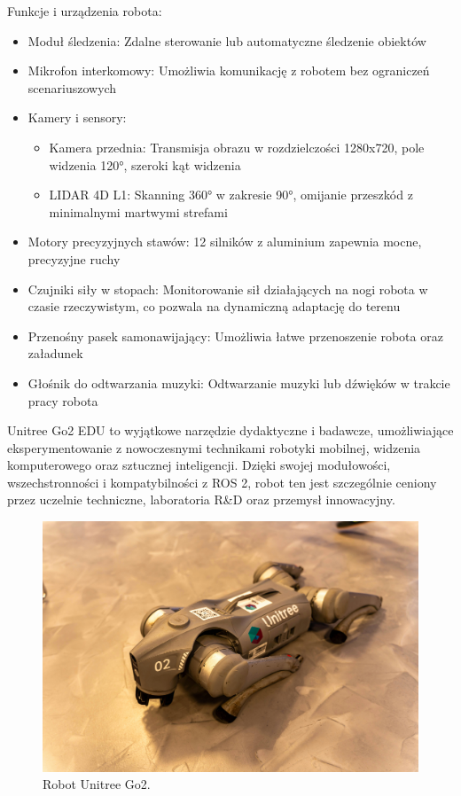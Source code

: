 \documentclass[12pt]{article}
\begin{document}
Funkcje i urządzenia robota:
\begin{itemize}
    \item Moduł śledzenia: Zdalne sterowanie lub automatyczne śledzenie obiektów
    \item Mikrofon interkomowy: Umożliwia komunikację z robotem bez ograniczeń scenariuszowych
    \item Kamery i sensory:
    \begin{itemize}
        \item Kamera przednia: Transmisja obrazu w rozdzielczości 1280x720, pole widzenia 120°, szeroki kąt widzenia
        \item LIDAR 4D L1: Skanning 360° w zakresie 90°, omijanie przeszkód z minimalnymi martwymi strefami
    \end{itemize}
    \item Motory precyzyjnych stawów: 12 silników z aluminium zapewnia mocne, precyzyjne ruchy
    \item Czujniki siły w stopach: Monitorowanie sił działających na nogi robota w czasie rzeczywistym, co pozwala na dynamiczną adaptację do terenu
    \item Przenośny pasek samonawijający: Umożliwia łatwe przenoszenie robota oraz załadunek
    \item Głośnik do odtwarzania muzyki: Odtwarzanie muzyki lub dźwięków w trakcie pracy robota
\end{itemize}


\noindent Unitree Go2 EDU to wyjątkowe narzędzie dydaktyczne i badawcze, umożliwiające eksperymentowanie z nowoczesnymi technikami robotyki mobilnej, widzenia komputerowego oraz sztucznej inteligencji. Dzięki swojej modułowości, wszechstronności i kompatybilności z ROS 2, robot ten jest szczególnie ceniony przez uczelnie techniczne, laboratoria R\&D oraz przemysł innowacyjny.


\begin{figure}[h]
    \centering
    \includegraphics[width=0.75\linewidth]{Zdjęcia/prawdziwyPies.jpg}
    \caption{Robot Unitree Go2.}
    \label{prawdziwyPies}
\end{figure}
\end{document}
